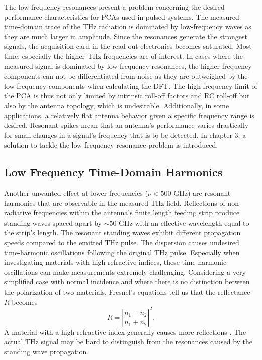The low frequency resonances present a problem concerning the desired performance characteristics for PCAs used in pulsed systems. The measured time-domain trace of the THz radiation is dominated by low-frequency waves as they are much larger in amplitude. Since the resonances generate the strongest signals, the acquisition card in the read-out electronics becomes saturated. Most time, especially the higher THz frequencies are of interest. In cases where the measured signal is dominated by low frequency resonances, the higher frequency components can not be differentiated from noise as they are outweighed by the low frequency components when calculating the DFT. The high frequency limit of the PCA is thus not only limited by intrinsic roll-off factors and RC roll-off but also by the antenna topology, which is undesirable. Additionally, in some applications, a relatively flat antenna behavior given a specific frequency range is desired. Resonant spikes mean that an antenna's performance varies drastically for small changes in a signal's frequency that is to be detected.  In chapter 3, a solution to tackle the low frequency resonance problem is introduced.

\subsection{Low Frequency Time-Domain Harmonics}
Another unwanted effect at lower frequencies ($\nu < 500$ \si{\giga \hertz}) are resonant harmonics that are observable in the measured THz field. Reflections of non-radiative frequencies within the antenna's finite length feeding strip produce standing waves spaced apart by $\sim$\num{50} \si{\giga \hertz} with an effective wavelength equal to the strip's length. The resonant standing waves exhibit different propagation speeds compared to the emitted THz pulse. The dispersion causes undesired time-harmonic oscillations following the original THz pulse. Especially when investigating materials with high refractive indices, these time-harmonic oscillations can make measurements extremely challenging. Considering a very simplified case with normal incidence and where there is no distinction between the polarization of two materials, Fresnel's equations tell us that the reflectance $R$ becomes 
\begin{equation}
    R = \left| \frac{n_1 - n_2}{n_1 + n_2} \right|^2.
\end{equation}
A material with a high refractive index generally causes more reflections \cite{gallegosRefractiveIndex2025}. The actual THz signal may be hard to distinguish from the resonances caused by the standing wave propagation. 

